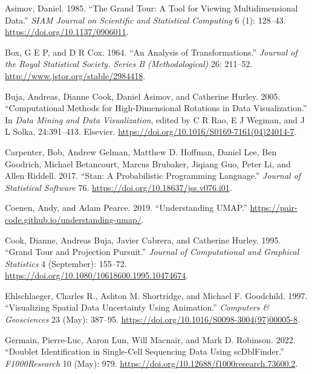 \hypertarget{refs}{}
\begin{CSLReferences}{1}{0}
\leavevmode{}%
Asimov, Daniel. 1985. {``{The Grand Tour}: A Tool for Viewing Multidimensional Data.''} \emph{SIAM Journal on Scientific and Statistical Computing} 6 (1): 128--43. \url{https://doi.org/10.1137/0906011}.

\leavevmode{}%
Box, G E P, and D R Cox. 1964. {``An Analysis of Transformations.''} \emph{Journal of the Royal Statistical Society. Series B (Methodological)} 26: 211--52. \url{http://www.jstor.org/stable/2984418}.

\leavevmode{}%
Buja, Andreas, Dianne Cook, Daniel Asimov, and Catherine Hurley. 2005. {``Computational Methods for High-Dimensional Rotations in Data Visualization.''} In \emph{Data Mining and Data Visualization}, edited by C R Rao, E J Wegman, and J L Solka, 24:391--413. Elsevier. \url{https://doi.org/10.1016/S0169-7161(04)24014-7}.

\leavevmode{}%
Carpenter, Bob, Andrew Gelman, Matthew D. Hoffman, Daniel Lee, Ben Goodrich, Michael Betancourt, Marcus Brubaker, Jiqiang Guo, Peter Li, and Allen Riddell. 2017. {``{Stan}: A Probabilistic Programming Language.''} \emph{Journal of Statistical Software} 76. \url{https://doi.org/10.18637/jss.v076.i01}.

\leavevmode{}%
Coenen, Andy, and Adam Pearce. 2019. {``Understanding {UMAP}.''} \url{https://pair-code.github.io/understanding-umap/}.

\leavevmode{}%
Cook, Dianne, Andreas Buja, Javier Cabrera, and Catherine Hurley. 1995. {``{Grand Tour} and {Projection Pursuit}.''} \emph{Journal of Computational and Graphical Statistics} 4 (September): 155--72. \url{https://doi.org/10.1080/10618600.1995.10474674}.

\leavevmode{}%
Ehlschlaeger, Charles R., Ashton M. Shortridge, and Michael F. Goodchild. 1997. {``Visualizing Spatial Data Uncertainty Using Animation.''} \emph{Computers \& Geosciences} 23 (May): 387--95. \url{https://doi.org/10.1016/S0098-3004(97)00005-8}.

\leavevmode{}%
Germain, Pierre-Luc, Aaron Lun, Will Macnair, and Mark D. Robinson. 2022. {``Doublet Identification in Single-Cell Sequencing Data Using {scDblFinder}.''} \emph{F1000Research} 10 (May): 979. \url{https://doi.org/10.12688/f1000research.73600.2}.


\end{CSLReferences}
